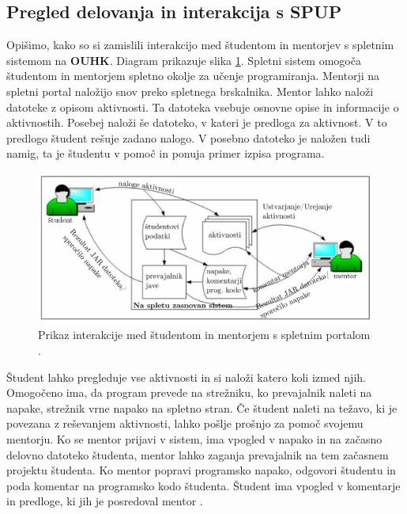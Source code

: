\subsection{Pregled delovanja in interakcija s SPUP}
\label{sec:pregled_delovanja_in_interakcija}

Opišimo, kako so si zamislili interakcijo med študentom in mentorjev s
spletnim sistemom na \textbf{OUHK}. Diagram prikazuje slika
\ref{fig:OUHK_workFlow}. Spletni sistem omogoča študentom in mentorjem
spletno okolje za učenje programiranja. Mentorji na spletni portal
naložijo snov preko spletnega brskalnika. Mentor lahko naloži datoteke z
opisom aktivnosti. Ta datoteka vsebuje osnovne opise in informacije o
aktivnostih. Posebej naloži še datoteko, v kateri je predloga za
aktivnost. V to predlogo študent rešuje zadano nalogo. V posebno
datoteko je naložen tudi namig, ta je študentu v pomoč in ponuja
primer izpisa programa.
\begin{figure}[htb!] \centering
  \includegraphics[width=0.9\linewidth, keepaspectratio =
1]{./images/SystemArch02_OUHK_DistanceEdu.jpg}
\caption{Prikaz interakcije med študentom in mentorjem s spletnim
  portalom \cite{ITaLCP_DistanceEdu}.}
  \label{fig:OUHK_workFlow}
\end{figure}

Študent lahko pregleduje vse aktivnosti in si naloži katero koli izmed
njih. Omogočeno ima, da program prevede na strežniku, ko prevajalnik
naleti na napake, strežnik vrne napako na spletno stran. Če študent
naleti na težavo, ki je povezana z reševanjem aktivnosti, lahko pošlje
prošnjo za pomoč svojemu mentorju. Ko se mentor prijavi v sistem, ima
vpogled v napako in na začasno delovno datoteko študenta, mentor lahko
zaganja prevajalnik na tem začasnem projektu študenta. Ko mentor
popravi programsko napako, odgovori študentu in poda komentar na
programsko kodo študenta. Študent ima vpogled v komentarje in
predloge, ki jih je posredoval mentor \cite{ITaLCP_DistanceEdu}.

